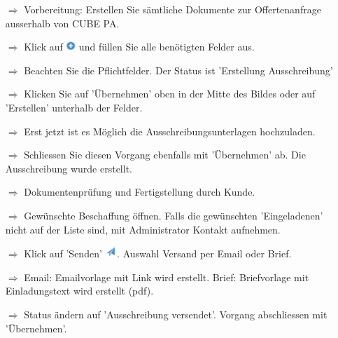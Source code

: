 \documentclass{article}
\begin{document}
\begin{multicols}{2}

\begin{tcolorbox}[colback=blue!5,colframe=blue!40!black,title=(1) Neue Beschaffung initialisieren]
\begin{itemize}
  \item[$\Longrightarrow$] Vorbereitung: Erstellen Sie sämtliche Dokumente zur Offertenanfrage ausserhalb von CUBE PA.
  \item[$\Longrightarrow$] Klick auf \includegraphics[height=10pt]{Icons/Plussymbol.jpg} und füllen Sie alle benötigten Felder aus.
  \item[$\Longrightarrow$] Beachten Sie die Pflichtfelder. Der Status ist 'Erstellung Ausschreibung'
  \item[$\Longrightarrow$] Klicken Sie auf 'Übernehmen' oben in der Mitte des Bildes oder auf 'Erstellen' unterhalb der Felder.
	\item[$\Longrightarrow$] Erst jetzt ist es Möglich die Ausschreibungsunterlagen hochzuladen.
  \item[$\Longrightarrow$] Schliessen Sie diesen Vorgang ebenfalls mit 'Übernehmen' ab. Die Ausschreibung wurde erstellt.
	\item[$\Longrightarrow$] Dokumentenprüfung und Fertigstellung durch Kunde.
\end{itemize}
\end{tcolorbox}




\begin{tcolorbox}[colback=blue!5,colframe=blue!40!black,title=(2) Offertanfrage versenden]
\begin{itemize}
  \item[$\Longrightarrow$] Gewünschte Beschaffung öffnen. Falls die gewünschten 'Eingeladenen' nicht auf der Liste sind, mit Administrator Kontakt aufnehmen.
	\item[$\Longrightarrow$] Klick auf 'Senden' \includegraphics[height=12pt]{Icons/Versandsymbol.jpg}. Auswahl Versand per Email oder Brief.
  \item[$\Longrightarrow$] Email: Emailvorlage mit Link wird erstellt. Brief: Briefvorlage mit Einladungstext wird erstellt (pdf).
  \item[$\Longrightarrow$] Status ändern auf 'Ausschreibung versendet'. Vorgang abschliessen mit 'Übernehmen'.
\end{itemize}
\end{tcolorbox}


\end{multicols}
\end{document}
